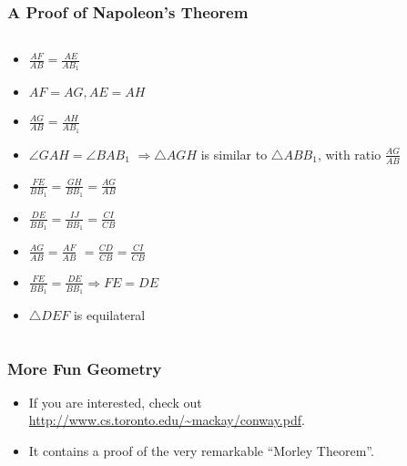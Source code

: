 \documentclass{beamer}
\begin{document}
\begin{frame}[fragile]
\frametitle{A Proof of Napoleon's Theorem}

\begin{columns}[c]


\begin{small}
\begin{itemize}
 \item  $\frac{AF}{AB} = \frac{AE}{AB_1}$
 \item  $AF = AG, AE = AH$
 \item  $\frac{AG}{AB} = \frac{AH}{AB_1}$
 \item  $\angle GAH = \angle BAB_1$ $\Rightarrow \triangle AGH$ is similar to $\triangle ABB_1$, with ratio $\frac{AG}{AB}$
 \item  $\frac{FE}{BB_1} = \frac{GH}{BB_1} = \frac{AG}{AB}$
 \item  $\frac{DE}{BB_1} = \frac{IJ}{BB_1} = \frac{CI}{CB}$
 \item $\frac{AG}{AB} =  \frac{AF}{AB} $  $= \frac{CD}{CB} = \frac{CI}{CB}$
 \item  $\frac{FE}{BB_1} = \frac{DE}{BB_1} \Rightarrow FE = DE$
 \item  $\triangle DEF$ is equilateral
\end{itemize}
\end{small}
\end{columns}
\end{frame}

\begin{frame}
\frametitle{More Fun Geometry}

\begin{itemize}
\item If you are interested, check out \url{http://www.cs.toronto.edu/~mackay/conway.pdf}.
\item It contains a proof of the very remarkable ``Morley Theorem''.
\end{itemize}

\end{frame}
\end{document}
